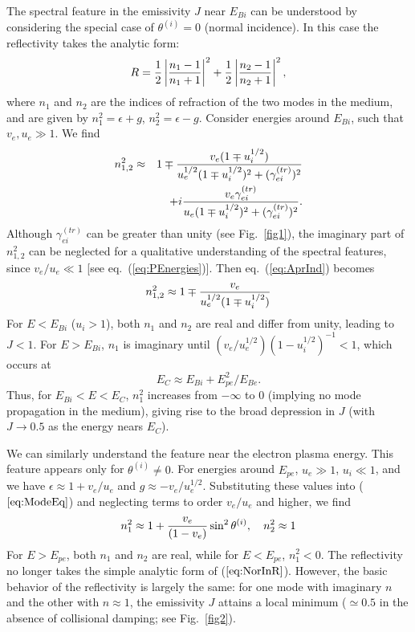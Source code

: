 \documentclass{emulateapj}
\newcommand{\be}{\begin{equation}}
\newcommand{\ee}{\end{equation}}
\newcommand{\snis}{\sin^2\theta^{(i)} }
\begin{document}
The spectral feature in the emissivity $J$ near $E_{Bi}$ can be understood by considering the special case of $\theta^{(i)}=0$ (normal incidence).  In this case the reflectivity takes the analytic form:
\begin{equation} \label{eq:NorInR}
R={1\over 2}\left|{{n_1-1}\over {n_1+1}}\right|^2+{1\over 2}\left|{{n_2-1}\over {n_2+1}}\right|^2,
\end{equation}
where $n_1$ and $n_2$ are the indices of refraction of the two modes in the medium,  
and are given by $n_{1}^2=\epsilon+g$, $n_{2}^2=\epsilon-g$.  Consider 
energies around $E_{Bi}$, such that $v_{e}, u_{e} \gg 1$.  We find
\begin{eqnarray}
\label{eq:AprInd}
n_{1,2}^2 &\approx& 1\mp {v_{e}(1\mp u_i^{1/2})\over u_{e}^{1/2}(1\mp u_i^{1/2})^2+
(\gamma_{ei}^{(tr)})^2}
\nonumber\\&&
+i{v_e\gamma_{ei}^{(tr)}\over u_e(1\mp u_i^{1/2})^2+
(\gamma_{ei}^{(tr)})^2}.
\end{eqnarray}
Although $\gamma_{ei}^{(tr)}$ can be greater than unity (see Fig.~\ref{fig1}), the 
imaginary part of $n_{1,2}^2$ can be neglected for a qualitative understanding of 
the spectral features, since $v_e/u_e \ll 1$ [see eq.~(\ref{eq:PEnergies})].  Then 
eq.~(\ref{eq:AprInd}) becomes
\be
n_{1,2}^2\approx 1\mp {v_{e}\over u_{e}^{1/2}(1\mp u_i^{1/2})}
\ee
For $E < E_{Bi}$ ($u_{i} > 1$), both $n_1$ and $n_2$ are real and differ from unity, 
leading to $J<1$.  
For $E > E_{Bi}$, $n_1$ is imaginary until
$(v_e/u_e^{1/2})(1-u_i^{1/2})^{-1}<1$, which occurs at
\be 
E_{C}\approx E_{Bi} + {E_{pe}^2 / E_{Be}}.
\label{eq:ec}\ee
Thus, for $E_{Bi} < E < E_{C}$, $n_1^2$ increases from $-\infty$ to $0$ 
(implying no mode propagation in the medium), giving rise to the broad depression 
in $J$ (with $J\rightarrow 0.5$ as the energy nears $E_{C}$).

We can similarly understand the feature near the electron plasma energy.  This feature 
appears only for $\theta^{(i)}\ne 0$. 
For energies around $E_{pe}$, $u_e\gg 1$, $u_i\ll 1$, and
we have $\epsilon\approx 1+v_e/u_e$ and $g\approx -v_e/u_e^{1/2}$. Substituting 
these values into
($\ref{eq:ModeEq}$) and neglecting terms to order $v_e/u_e$ and higher, we find
\begin{equation} \label{eq:ApproxInd}
n_1^2\approx 1+{v_e\over {(1-v_e)}}\snis,\quad n_2^2\approx 1
\end{equation}
For $E> E_{pe}$, both $n_1$ and $n_2$ are real, while for $E<E_{pe}$, 
$n_1^2<0$. The reflectivity no longer takes
the simple analytic form of ($\ref{eq:NorInR}$). However, the basic behavior of
the reflectivity is largely
the same: for one mode with imaginary $n$ and the
other with $n\approx 1$, the emissivity $J$ attains a local minimum ($\simeq 0.5$
in the absence of collisional damping; see Fig.~\ref{fig2}).
\end{document}
